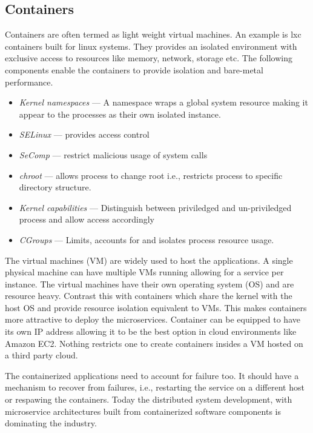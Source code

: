 \documentclass[conference]{IEEEtran}
\begin{document}
\subsection{Containers}
Containers \cite{lxc} \cite{kubernetes} are often termed as light weight virtual machines. An example is lxc containers built for linux systems. They provides an isolated environment with exclusive access to resources like memory, network, storage etc. The following components enable the containers to provide isolation and bare-metal performance.
\begin{itemize}
\item \textit{Kernel namespaces} --- A namespace wraps a global system resource making it appear to the processes as their own isolated instance.
\item \textit{SELinux} --- provides access control
\item \textit{SeComp} --- restrict malicious usage of system calls
\item \textit{chroot} --- allows process to change root i.e., restricts process to specific directory structure.
\item \textit{Kernel capabilities} --- Distinguish between priviledged and un-priviledged process and allow access accordingly
\item \textit{CGroups} --- Limits, accounts for and isolates process resource usage.
\end{itemize}

The virtual machines (VM) are widely used to host the applications. A single physical machine can have multiple VMs running allowing for a service per instance. The virtual machines have their own operating system (OS) and are resource heavy. Contrast this with containers which share the kernel with the host OS and provide resource isolation equivalent to VMs. This makes containers more attractive to deploy the microservices. Container can be equipped to have its own IP address allowing it to be the best option in cloud environments like Amazon EC2. Nothing restricts one to create containers insides a VM hosted on a third party cloud. \par
The containerized applications need to account for failure too. It should have a mechanism to recover from failures, i.e., restarting the service on a different host or respawing the containers. 
Today the distributed system development, with microservice architectures built from containerized software components \cite{containerPatterns} is dominating the industry.
\end{document}
